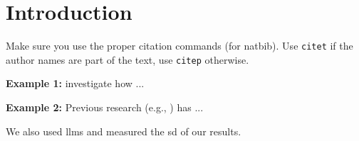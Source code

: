 \section{Introduction}
\label{sec:icse19:introduction}

Make sure you use the proper citation commands (for natbib). 
Use \texttt{citet} if the author names are part of the text, use \texttt{citep} otherwise.

\noindent \textbf{Example 1:} 
\citet{schermann:18:2} investigate how ...

\noindent \textbf{Example 2:} 
Previous research (e.g., \citep{schermann:18:2}) has ...

We also used \acp{llm} and measured the \ac{sd} of our results.
